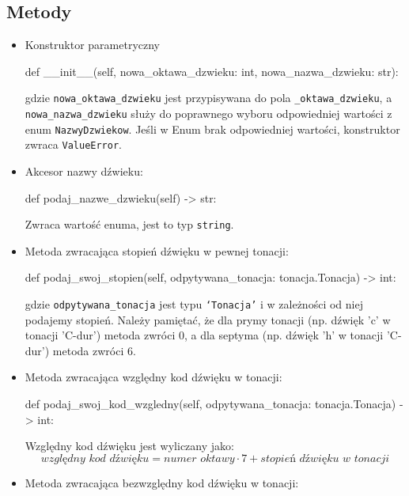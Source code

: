 \documentclass[dokumentacja.tex]{subfiles}
\begin{document}
\subsection{Metody}
\begin{itemize}
    \item Konstruktor parametryczny
        \begin{python}
     def __init__(self, nowa_oktawa_dzwieku: int, nowa_nazwa_dzwieku: str):
        \end{python}
        gdzie \texttt{nowa\_oktawa\_dzwieku} jest przypisywana do pola \texttt{\_oktawa\_dzwieku}, a \texttt{nowa\_nazwa\_dzwieku} służy do poprawnego wyboru odpowiedniej wartości z enum \texttt{NazwyDzwiekow}. Jeśli w Enum brak odpowiedniej wartości, konstruktor zwraca \texttt{ValueError}.

    \item Akcesor nazwy dźwieku:
          \begin{python}
    def podaj_nazwe_dzwieku(self) -> str:
          \end{python}
        Zwraca wartość enuma, jest to typ \texttt{string}.  

    \item Metoda zwracająca stopień dźwięku w pewnej tonacji:
        \begin{python}
    def podaj_swoj_stopien(self, odpytywana_tonacja: tonacja.Tonacja) -> int:
        \end{python}
        gdzie \texttt{odpytywana\_tonacja} jest typu \texttt{`Tonacja'} i w zależności od niej podajemy stopień. Należy pamiętać, że dla prymy tonacji (np. dźwięk 'c' w tonacji 'C-dur') metoda zwróci 0, a dla septyma (np. dźwięk 'h' w tonacji 'C-dur') metoda zwróci 6.


    \item Metoda zwracająca względny kod dźwięku w tonacji:
    \begin{python}
    def podaj_swoj_kod_wzgledny(self, odpytywana_tonacja: tonacja.Tonacja) -> int:
    \end{python}
    Względny kod dźwięku jest wyliczany jako:
        \begin{equation}
            \textit{względny kod dźwięku} = \textit{numer oktawy} \cdot 7 + \textit{stopień dźwięku w tonacji}
        \end{equation}
        \clearpage
        \item Metoda zwracająca bezwzględny kod dźwięku w tonacji: \label{punkt:bezwzglednyKodDzwieku}


\end{itemize}
\end{document}

